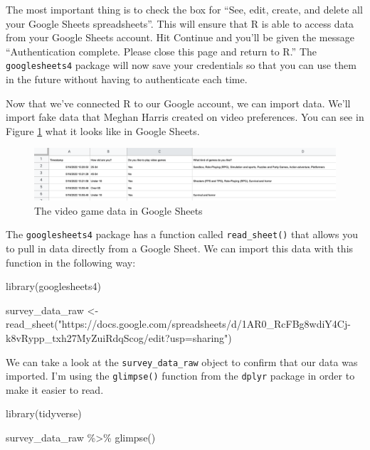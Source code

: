 \documentclass[
]{book}
\newenvironment{Shaded}{\begin{snugshade}}{\end{snugshade}}
\newcommand{\FunctionTok}[1]{\textcolor[rgb]{0.00,0.00,0.00}{#1}}
\newcommand{\NormalTok}[1]{#1}
\newcommand{\OtherTok}[1]{\textcolor[rgb]{0.56,0.35,0.01}{#1}}
\newcommand{\SpecialCharTok}[1]{\textcolor[rgb]{0.00,0.00,0.00}{#1}}
\newcommand{\StringTok}[1]{\textcolor[rgb]{0.31,0.60,0.02}{#1}}
\begin{document}
The most important thing is to check the box for ``See, edit, create, and delete all your Google Sheets spreadsheets''. This will ensure that R is able to access data from your Google Sheets account. Hit Continue and you'll be given the message ``Authentication complete. Please close this page and return to R.'' The \texttt{googlesheets4} package will now save your credentials so that you can use them in the future without having to authenticate each time.

Now that we've connected R to our Google account, we can import data. We'll import fake data that Meghan Harris created on video preferences. You can see in Figure \ref{fig:video-game-survey-data} what it looks like in Google Sheets.

\begin{figure}
\includegraphics[width=1\linewidth]{assets/video-game-survey-data} \caption{The video game data in Google Sheets}\label{fig:video-game-survey-data}
\end{figure}

The \texttt{googlesheets4} package has a function called \texttt{read\_sheet()} that allows you to pull in data directly from a Google Sheet. We can import this data with this function in the following way:

\begin{Shaded}
\begin{Highlighting}[]
\FunctionTok{library}\NormalTok{(googlesheets4)}

\NormalTok{survey\_data\_raw }\OtherTok{\textless{}{-}} \FunctionTok{read\_sheet}\NormalTok{(}\StringTok{"https://docs.google.com/spreadsheets/d/1AR0\_RcFBg8wdiY4Cj{-}k8vRypp\_txh27MyZuiRdqScog/edit?usp=sharing"}\NormalTok{)}
\end{Highlighting}
\end{Shaded}

We can take a look at the \texttt{survey\_data\_raw} object to confirm that our data was imported. I'm using the \texttt{glimpse()} function from the \texttt{dplyr} package in order to make it easier to read.

\begin{Shaded}
\begin{Highlighting}[]
\FunctionTok{library}\NormalTok{(tidyverse)}

\NormalTok{survey\_data\_raw }\SpecialCharTok{\%\textgreater{}\%} 
  \FunctionTok{glimpse}\NormalTok{()}
\end{Highlighting}
\end{Shaded}
\end{document}
